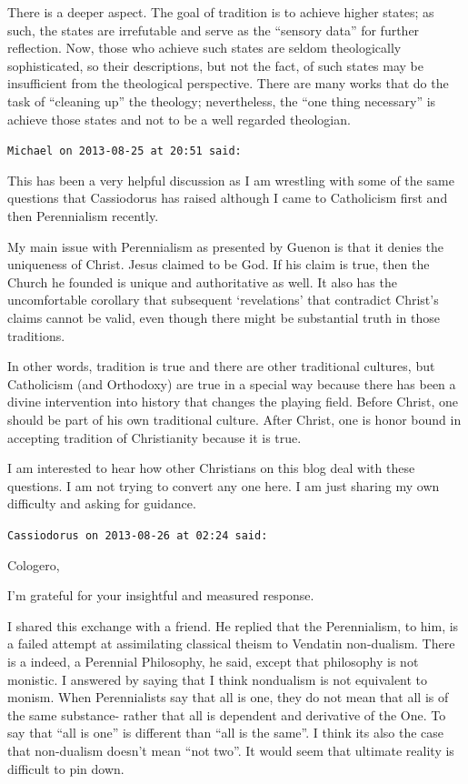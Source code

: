 \begin{footnotesize}
\begin{sffamily}
There is a deeper aspect. The goal of tradition is to achieve higher states; as such, the states are irrefutable and serve as the ``sensory data'' for further reflection. Now, those who achieve such states are seldom theologically sophisticated, so their descriptions, but not the fact, of such states may be insufficient from the theological perspective. There are many works that do the task of ``cleaning up'' the theology; nevertheless, the ``one thing necessary'' is achieve those states and not to be a well regarded theologian.

\hfill

\texttt{Michael on 2013-08-25 at 20:51 said:}

This has been a very helpful discussion as I am wrestling with some of the same questions that Cassiodorus has raised although I came to Catholicism first and then Perennialism recently.

My main issue with Perennialism as presented by Guenon is that it denies the uniqueness of Christ. Jesus claimed to be God. If his claim is true, then the Church he founded is unique and authoritative as well. It also has the uncomfortable corollary that subsequent `revelations' that contradict Christ's claims cannot be valid, even though there might be substantial truth in those traditions.

In other words, tradition is true and there are other traditional cultures, but Catholicism (and Orthodoxy) are true in a special way because there has been a divine intervention into history that changes the playing field. Before Christ, one should be part of his own traditional culture. After Christ, one is honor bound in accepting tradition of Christianity because it is true.

I am interested to hear how other Christians on this blog deal with these questions. I am not trying to convert any one here. I am just sharing my own difficulty and asking for guidance.

\hfill

\texttt{Cassiodorus on 2013-08-26 at 02:24 said:}

Cologero,

I'm grateful for your insightful and measured response.

I shared this exchange with a friend. He replied that the Perennialism, to him, is a failed attempt at assimilating classical theism to Vendatin non-dualism. There is a indeed, a Perennial Philosophy, he said, except that philosophy is not monistic. I answered by saying that I think nondualism is not equivalent to monism. When Perennialists say that all is one, they do not mean that all is of the same substance- rather that all is dependent and derivative of the One. To say that ``all is one'' is different than ``all is the same''. I think its also the case that non-dualism doesn't mean ``not two''. It would seem that ultimate reality is difficult to pin down.


\end{sffamily}
\end{footnotesize}
